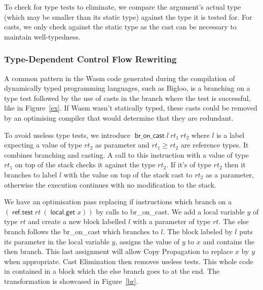 \documentclass[a4paper,11pt]{article}
\DeclareMathOperator{\broncast}{\textsf{br\_on\_cast}}
\DeclareMathOperator{\reftest}{\textsf{ref.test}}
\DeclareMathOperator{\localget}{\textsf{local.get}}
\begin{document}
To check for type tests to eliminate, we compare the argument's actual type
(which may be smaller than its static type) against the type it is tested for.
For casts, we only check against the static type as the cast can be necessary to
maintain well-typedness.

\subsubsection{Type-Dependent Control Flow Rewriting}
A common pattern in the Wasm code generated during the compilation of
dynamically typed programming languages, such as Bigloo, is a branching on a
type test followed by the use of casts in the branch where the test is
successful, like in Figure~\ref{ex}. If Wasm wasn't statically typed, these
casts could be removed by an optimising compiler that would determine that they
are redundant.

To avoid useless type tests, we introduce $\broncast l\ rt_1\ rt_2$ where $l$ is
a label expecting a value of type $rt_2$ as parameter and $rt_1\geq rt_2$ are
reference types. It combines branching and casting. A call to this instruction
with a value of type $rt_1$ on top of the stack checks it against the type
$rt_2$. If it's of type $rt_2$ then it branches to label $l$ with the value on
top of the stack cast to $rt_2$ as a parameter, otherwise the execution
continues with no modification to the stack.

We have an optimisation pass replacing \textsf{if} instructions which branch on
a $(\reftest rt\ (\localget x))$ by calls to \textsf{br\_on\_cast}. We add a
local variable $y$ of type $rt$ and create a new block labelled $l$ with a
parameter of type $rt$. The else branch follows the \textsf{br\_on\_cast} which
branches to $l$. The block labeled by $l$ puts its parameter in the local
variable $y$, assigns the value of $y$ to $x$ and contains the then branch. This
last assignment will allow Copy Propagation to replace $x$ by $y$ when
appropriate. Cast Elimination then removes useless tests. This whole code in
contained in a block which the else branch goes to at the end. The
transformation is showcased in Figure~\ref{br}.
\end{document}
